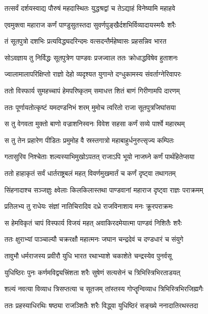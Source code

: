 \twolineshloka
{तत्सर्वं दर्शयस्वाद्य पौरुषं महदास्थितः}
{युद्धश्रद्वां च तेऽद्याहं विनेष्यामि महाहवे}


\twolineshloka
{एवमुक्त्वा महाराज कर्णं पाण्डुसुतस्तदा}
{सुवर्णपुङ्खैर्दशभिर्विव्यादायस्मयैः शरैः}


\twolineshloka
{तं सूतपुत्रो दशभिः प्रत्यविद्ध्यदरिन्दमः}
{वत्सदन्तैर्महेष्वासः प्रहसन्निव भारत}


\twolineshloka
{सोऽवज्ञाय तु निर्विद्धः सूतपुत्रेण पाण्डवः}
{प्रजज्वाल ततः क्रोधाद्धविषेव हुताशनः}


\twolineshloka
{ज्वालामालापरिक्षिप्तो राज्ञो देहो व्यदृश्यत}
{युगान्ते दग्धुकामस्य संवर्ताग्नेरिवापरः}


\twolineshloka
{ततो विस्फार्य सुमहच्चापं हेमपरिष्कृतम्}
{समाधत्त शितं बाणं गिरीणामपि दारणम्}


\twolineshloka
{ततः पूर्णायतोत्कृष्टं यमदण्डनिभं शरम्}
{मुमोच त्वरितो राजा सूतपुत्रजिघांसया}


\twolineshloka
{स तु वेगवता मुक्तो बाणो वज्राशनिस्वनः}
{विवेश सहसा कर्णं सव्ये पार्श्वे महारथम्}


\twolineshloka
{स तु तेन प्रहारेण पीडितः प्रमुमोह वै}
{स्रस्तगात्रो महाबाहुर्धनुरुत्सृज्य कम्पितः}


\twolineshloka
{गतासुरिव निश्चेताः शल्यस्याभिमुखोऽपतत्}
{राजाऽपि भूयो नाजघ्ने कर्णं पार्थहितेप्सया}


\twolineshloka
{ततो हाहाकृतं सर्वं धार्तराष्ट्रबलं महत्}
{विवर्णमुखमार्तं च कर्णं दृष्ट्वा तथागतम्}


\twolineshloka
{सिंहनादाश्च सञ्जज्ञुः क्ष्वेलाः किलकिलास्तथा}
{पाण्डवानां महाराज दृष्ट्वा राज्ञः पराक्रमम्}


\twolineshloka
{प्रतिलभ्य तु राधेयः संज्ञां नातिचिरादिव}
{दध्रे राजविनाशाय मनः क्रूरपराक्रमः}


\twolineshloka
{स हेमविकृतं चापं विस्फार्य विजयं महत्}
{अवाकिरदमेयात्मा पाण्डवं निशितैः शरैः}


\twolineshloka
{ततः क्षुराभ्यां पाञ्चाल्यौ चक्ररक्षौ महात्मनः}
{जघान चन्द्रदेवं च दण्डधारं च संयुगे}


\twolineshloka
{तावुभौ धर्मराजस्य प्रवीरौ युधि भारत}
{रथाभ्याशे चकाशेते चन्द्रस्येव पुनर्वसू}


\twolineshloka
{युधिष्ठिरः पुनः कर्णमविद्व्यत्त्रिंशता शरैः}
{सुषेणं सत्यसेनं च त्रिभिस्त्रिभिरताडयत्}


\twolineshloka
{शल्यं नवत्या विव्याध त्रिसप्तत्या च सूतजम्}
{तांस्तस्य गोप्तॄन्विव्याध त्रिभिस्त्रिभिरजिह्मगैः}


\twolineshloka
{ततः प्रहस्याधिरथिः षष्ठ्या राजञ्शितैः शरैः}
{विद्ध्वा युधिष्ठिरं सङ्ख्ये ननादातिरथस्तदा}


